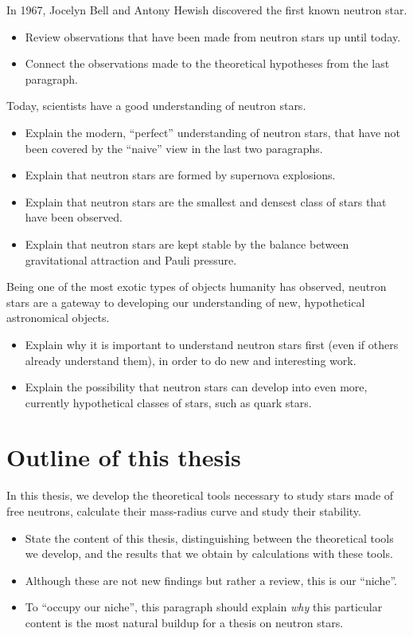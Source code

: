 In 1967, Jocelyn Bell and Antony Hewish discovered the first known neutron star.
\begin{itemize}
\item Review observations that have been made from neutron stars up until today.
\item Connect the observations made to the theoretical hypotheses from the last paragraph.
\end{itemize}

Today, scientists have a good understanding of neutron stars.
\begin{itemize}
\item Explain the modern, ``perfect'' understanding of neutron stars, that have not been covered by the ``naive'' view in the last two paragraphs.
\item Explain that neutron stars are formed by supernova explosions.
\item Explain that neutron stars are the smallest and densest class of stars that have been observed.
\item Explain that neutron stars are kept stable by the balance between gravitational attraction and Pauli pressure.
\end{itemize}

Being one of the most exotic types of objects humanity has observed, neutron stars are a gateway to developing our understanding of new, hypothetical astronomical objects.
\begin{itemize}
\item Explain why it is important to understand neutron stars first (even if others already understand them), in order to do new and interesting work.
\item Explain the possibility that neutron stars can develop into even more, currently hypothetical classes of stars, such as quark stars.
\end{itemize}

\section*{Outline of this thesis}

In this thesis, we develop the theoretical tools necessary to study stars made of free neutrons, calculate their mass-radius curve and study their stability.
\begin{itemize}
\item State the content of this thesis, distinguishing between the theoretical tools we develop, and the results that we obtain by calculations with these tools.
\item Although these are not new findings but rather a review, this is our ``niche''.
\item To ``occupy our niche'', this paragraph should explain \emph{why} this particular content is the most natural buildup for a thesis on neutron stars.
\end{itemize}

